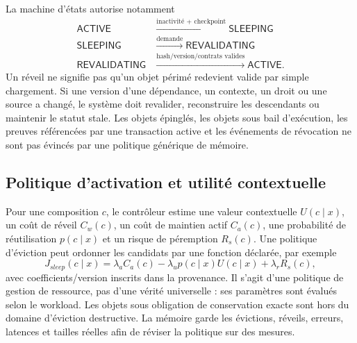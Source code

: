 \documentclass[11pt,a4paper]{article}
\theoremstyle{definition}
\theoremstyle{plain}
\theoremstyle{remark}
\begin{document}
La machine d'états autorise notamment
\[
\begin{aligned}
\mathsf{ACTIVE} &\xrightarrow{\text{inactivité + checkpoint}} \mathsf{SLEEPING}\\
\mathsf{SLEEPING} &\xrightarrow{\text{demande}} \mathsf{REVALIDATING}\\
\mathsf{REVALIDATING} &\xrightarrow{\text{hash/version/contrats valides}} \mathsf{ACTIVE}.
\end{aligned}
\]
Un réveil ne signifie pas qu'un objet périmé redevient valide par simple chargement. Si une version d'une dépendance, un contexte, un droit ou une source a changé, le système doit revalider, reconstruire les descendants ou maintenir le statut stale. Les objets épinglés, les objets sous bail d'exécution, les preuves référencées par une transaction active et les événements de révocation ne sont pas évincés par une politique générique de mémoire.

\subsection{Politique d'activation et utilité contextuelle}
Pour une composition $c$, le contrôleur estime une valeur contextuelle $U(c\mid x)$, un coût de réveil $C_w(c)$, un coût de maintien actif $C_a(c)$, une probabilité de réutilisation $p(c\mid x)$ et un risque de péremption $R_s(c)$. Une politique d'éviction peut ordonner les candidats par une fonction déclarée, par exemple
\[
J_{sleep}(c\mid x)=\lambda_a C_a(c)-\lambda_u p(c\mid x)U(c\mid x)+\lambda_r R_s(c),
\]
avec coefficients/version inscrits dans la provenance. Il s'agit d'une politique de gestion de ressource, pas d'une vérité universelle : ses paramètres sont évalués selon le workload. Les objets sous obligation de conservation exacte sont hors du domaine d'éviction destructive. La mémoire garde les évictions, réveils, erreurs, latences et tailles réelles afin de réviser la politique sur des mesures.
\end{document}
